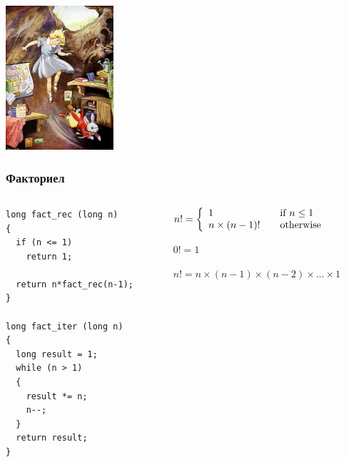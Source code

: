\documentclass{beamer}
\begin{document}
\begin{frame}
\begin{center}
   \includegraphics[width=4cm]{images/hole}
\end{center}

\end{frame}



\begin{frame}[fragile]
\frametitle{Факториел}


\begin{columns}[t]
  \begin{column}{0.55\textwidth}

\begin{lstlisting}
long fact_rec (long n)
{
  if (n <= 1)
    return 1;

  return n*fact_rec(n-1);
}

long fact_iter (long n)
{
  long result = 1;
  while (n > 1)
  {
    result *= n;
    n--;
  }
  return result;
}

\end{lstlisting}


  \end{column}
  \begin{column}{0.45\textwidth}
\begin{flushleft}
  $n! = \left\{
        \begin{array}{l l}
          1 & \quad \text{if $n \leq 1$ }\\
    n \times (n-1)! & \quad \text{otherwise}
  \end{array} \right.$

  \vspace{10px}

  $0! = 1$

  $n! = n \times (n-1) \times (n-2) \times ... \times 1$


\end{flushleft}
  \end{column}
\end{columns}

\end{frame}
\end{document}
